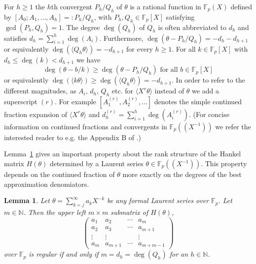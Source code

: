 \documentclass[10pt,a4paper]{amsart}
\newcommand{\NN}{\mathbb N}
\newcommand{\FF}{\mathbb{F}}
\renewcommand{\(}{\left (}
\renewcommand{\)}{\right )}
\newtheorem{lemma}[theorem]{Lemma}
\theoremstyle{definition}
\numberwithin{equation}{section}
\begin{document}
For $h\geq 1$ the $h$th convergent $P_h/Q_h$ of $\theta$ is a rational function in $\FF_p(X)$ defined by $[A_0;A_1,\ldots,A_h]=:P_h/Q_h$, with $P_h,Q_h\in\FF_p[X]$ satisfying $\gcd(P_h,Q_h)=1$. The degree $\deg(Q_h)$ of $Q_h$ is often abbreviated to $d_h$ and satisfies $d_h=\sum_{i=1}^h\deg(A_i)$. Furthermore, $\deg(\theta-P_h/Q_h)=-d_h-d_{h+1}$ or equivalently $\deg(\langle Q_h \theta\rangle)=-d_{h+1}$ for every $h\geq 1$. For all $k\in\FF_p[X]$ with $d_h\leq \deg(k)<d_{h+1}$ we have $$\deg(\theta-b/k)\geq \deg(\theta-P_h/Q_h) \mbox{ for all $b\in\FF_p[X]$}$$ or equivalently $\deg(\langle k\theta\rangle)\geq \deg(\langle Q_h\theta\rangle)=-d_{h+1}$. In order to refer to the different magnitudes, as $A_i,\,d_h,\,Q_h$ etc. for $\langle X^r \theta\rangle$ instead of $\theta$ we add a superscript $(r)$. For example $[A^{(r)}_1,A^{(r)}_2,\ldots]$ denotes the simple continued fraction expansion of $\langle X^r \theta\rangle$ and $d^{(r)}_h=\sum_{i=1}^h\deg(A^{(r)}_i)$. (For concise information on continued fractions and convergents in $\FF_p((X^{-1}))$ we refer the interested reader to e.g. the Appendix B of \cite{niesiam}.)

Lemma~\ref{prop:1} gives an important property about the rank structure of the Hankel matrix $H(\theta)$ determined by a Laurent series $\theta\in\FF_p((X^{-1}))$. This property depends on the continued fraction of $\theta$ more exactly on the degrees of the best approximation denomiators. %


\begin{lemma}\label{prop:1}
	Let $\theta=\sum_{k=j}^\infty a_kX^{-k}$ be any formal Laurent series over $\FF_p$. Let $m\in\NN$. Then
	the upper left $m\times m$ submatrix of $H(\theta)$, 
	$$\begin{pmatrix}
		a_1&a_2&\cdots&a_m\\
		a_2&a_3&\cdots&a_{m+1}\\
		\vdots&\vdots&&\vdots\\
		a_{m}&a_{m+1}&\cdots&a_{m+m-1} 
	\end{pmatrix} $$
	over $\FF_p$ is regular if and only if $m=d_h=\deg(Q_h)$ for an $h\in\NN$. 
\end{lemma}
\end{document}
